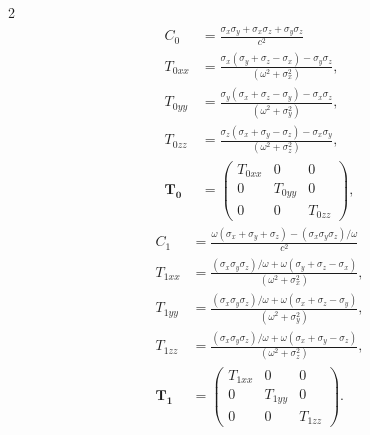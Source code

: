 \documentclass[final,12pt,nopreprintline,longtitle]{elsarticle}
\begin{document}
\begin{paracol}{2}
      \begin{equation*}
        \begin{aligned}
            C_0 &= \frac{\sigma_x\sigma_y + \sigma_x\sigma_z + \sigma_y\sigma_z}{c^2} \\%
            T_{0xx} &= \frac{\sigma_x(\sigma_y+\sigma_z-\sigma_x) - \sigma_y\sigma_z}{(\omega^2 + \sigma^2_x)}, \\
            T_{0yy} &= \frac{\sigma_y(\sigma_x+\sigma_z-\sigma_y)-\sigma_x\sigma_z}{(\omega^2 + \sigma^2_y)}, \\
            T_{0zz} &= \frac{\sigma_z(\sigma_x+\sigma_y-\sigma_z)-\sigma_x\sigma_y}{(\omega^2 + \sigma^2_z)}, \\
            \mathbf{T_0} &= \begin{pmatrix}
              T_{0xx} & 0 & 0 \\
             0 &  T_{0yy} & 0 \\
             0 & 0 &  T_{0zz}
            \end{pmatrix},
        \end{aligned}
    \end{equation*}
    \switchcolumn
       \begin{equation*}
        \begin{aligned}
            C_1 &= \frac{\omega(\sigma_x+\sigma_y+\sigma_z) - (\sigma_x\sigma_y\sigma_z)/\omega}{c^2} \\%
            T_{1xx} &= \frac{(\sigma_x\sigma_y\sigma_z)/\omega + \omega(\sigma_y+\sigma_z-\sigma_x)}{(\omega^2 + \sigma^2_x)}, \\
            T_{1yy} &= \frac{(\sigma_x\sigma_y\sigma_z)/\omega + \omega(\sigma_x+\sigma_z-\sigma_y)}{(\omega^2 + \sigma^2_y)}, \\
            T_{1zz} &= \frac{(\sigma_x\sigma_y\sigma_z)/\omega + \omega(\sigma_x+\sigma_y-\sigma_z)}{(\omega^2 + \sigma^2_z)}, \\
            \mathbf{T_1} &= \begin{pmatrix}
              T_{1xx} & 0 & 0 \\
             0 &  T_{1yy} & 0 \\
             0 & 0 &  T_{1zz}
            \end{pmatrix}.
        \end{aligned}
    \end{equation*}
\end{paracol}
\end{document}
